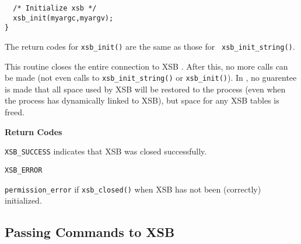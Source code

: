 \begin{description}
\begin{itemize}
\begin{verbatim}
  /* Initialize xsb */
  xsb_init(myargc,myargv);
}
    \end{verbatim}
\end{itemize}
The return codes for {\tt xsb\_init()} are the same as those for {\tt
  xsb\_init\_string()}.

 
%
This routine closes the entire connection to XSB .  After this, no
more calls can be made (not even calls to {\tt xsb\_init\_string()} or
{\tt xsb\_init()}).  In \version{}, no guarentee is made that all
space used by XSB will be restored to the process (even when the
process has dynamically linked to XSB), but space for any XSB tables
is freed.

{\bf Return Codes} 
\bi
\item {\tt XSB\_SUCCESS} indicates that XSB was closed successfully.
%
\item {\tt XSB\_ERROR} 
\bi
\item {\tt permission\_error} if {\tt xsb\_closed()} when XSB has not been
(correctly) initialized.  
\ei
%
\ei

\end{description}

\subsection{Passing Commands to XSB}

